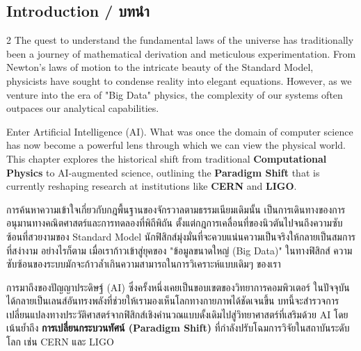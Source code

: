 \subsection{Introduction \quad / \quad \textthai{บทนำ}}
\begin{paracol}{2}
The quest to understand the fundamental laws of the universe has traditionally been a journey of mathematical derivation and meticulous experimentation. From Newton's laws of motion to the intricate beauty of the Standard Model, physicists have sought to condense reality into elegant equations. However, as we venture into the era of "Big Data" physics, the complexity of our systems often outpaces our analytical capabilities. 

Enter Artificial Intelligence (AI). What was once the domain of computer science has now become a powerful lens through which we can view the physical world. This chapter explores the historical shift from traditional \textbf{Computational Physics} to AI-augmented science, outlining the \textbf{Paradigm Shift} that is currently reshaping research at institutions like \textbf{CERN} and \textbf{LIGO}.

\switchcolumn

\begin{thai}
การค้นหาความเข้าใจเกี่ยวกับกฎพื้นฐานของจักรวาลตามธรรมเนียมเดิมนั้น เป็นการเดินทางของการอนุมานทางคณิตศาสตร์และการทดลองที่พิถีพิถัน ตั้งแต่กฎการเคลื่อนที่ของนิวตันไปจนถึงความซับซ้อนที่สวยงามของ Standard Model นักฟิสิกส์มุ่งมั่นที่จะควบแน่นความเป็นจริงให้กลายเป็นสมการที่สง่างาม อย่างไรก็ตาม เมื่อเราก้าวเข้าสู่ยุคของ "ข้อมูลขนาดใหญ่ (Big Data)" ในทางฟิสิกส์ ความซับซ้อนของระบบมักจะก้าวล้ำเกินความสามารถในการวิเคราะห์แบบเดิมๆ ของเรา

การมาถึงของปัญญาประดิษฐ์ (AI) ซึ่งครั้งหนึ่งเคยเป็นขอบเขตของวิทยาการคอมพิวเตอร์ ในปัจจุบันได้กลายเป็นเลนส์อันทรงพลังที่ช่วยให้เรามองเห็นโลกทางกายภาพได้ชัดเจนขึ้น บทนี้จะสำรวจการเปลี่ยนแปลงทางประวัติศาสตร์จากฟิสิกส์เชิงคำนวณแบบดั้งเดิมไปสู่วิทยาศาสตร์ที่เสริมด้วย AI โดยเน้นย้ำถึง \textbf{การเปลี่ยนกระบวนทัศน์ (Paradigm Shift)} ที่กำลังปรับโฉมการวิจัยในสถาบันระดับโลก เช่น CERN และ LIGO
\end{thai}
\end{paracol}

